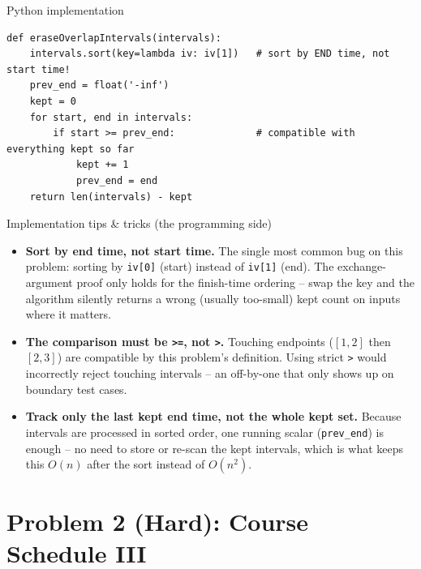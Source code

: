 \documentclass[11pt,aspectratio=169]{beamer}
\begin{document}
\begin{frame}[fragile]{Python implementation}
  \begin{lstlisting}[style=py]
def eraseOverlapIntervals(intervals):
    intervals.sort(key=lambda iv: iv[1])   # sort by END time, not start time!
    prev_end = float('-inf')
    kept = 0
    for start, end in intervals:
        if start >= prev_end:              # compatible with everything kept so far
            kept += 1
            prev_end = end
    return len(intervals) - kept
  \end{lstlisting}
\end{frame}

\begin{frame}{Implementation tips \& tricks (the programming side)}
  \small
  \begin{itemize}
    \item \textbf{Sort by end time, not start time.} The single most common bug on
    this problem: sorting by \texttt{iv[0]} (start) instead of \texttt{iv[1]} (end).
    The exchange-argument proof only holds for the finish-time ordering -- swap the
    key and the algorithm silently returns a wrong (usually too-small) kept count on
    inputs where it matters.
    \item \textbf{The comparison must be \texttt{>=}, not \texttt{>}.} Touching
    endpoints ($[1,2]$ then $[2,3]$) are compatible by this problem's definition.
    Using strict \texttt{>} would incorrectly reject touching intervals -- an
    off-by-one that only shows up on boundary test cases.
    \item \textbf{Track only the last kept end time, not the whole kept set.} Because
    intervals are processed in sorted order, one running scalar (\texttt{prev\_end})
    is enough -- no need to store or re-scan the kept intervals, which is what keeps
    this $O(n)$ after the sort instead of $O(n^2)$.
  \end{itemize}
\end{frame}

\section{Problem 2 (Hard): Course Schedule III}
\end{document}
